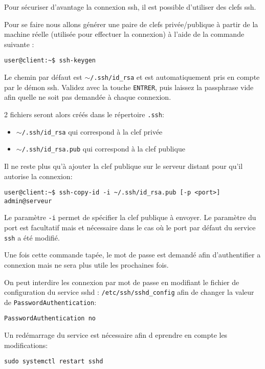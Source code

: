 Pour sécuriser d'avantage la connexion ssh, il est possible d'utiliser des clefs ssh.

Pour se faire nous allons générer une paire de clefs privée/publique à partir de la machine réelle (utilisée pour effectuer la connexion) à l'aide de la commande suivante :

    \begin{verbatim}
user@client:~$ ssh-keygen    
    \end{verbatim}

Le chemin par défaut est \texttt{$\sim$/.ssh/id\_rsa} et est automatiquement pris en compte par le démon ssh. Validez avec la touche \texttt{ENTRER}, puis laissez la passphrase vide afin quelle ne soit pas demandée à chaque connexion.

2 fichiers seront alors créés dans le répertoire \texttt{.ssh}:

    \begin{itemize}
         \item \texttt{$\sim$/.ssh/id\_rsa} qui correspond à la clef privée\\
         \item \texttt{$\sim$/.ssh/id\_rsa.pub} qui correspond à la clef publique\\
    \end{itemize}
Il ne reste plus qu'à ajouter la clef publique sur le serveur distant pour qu'il autorise la connexion:

\begin{verbatim}
user@client:~$ ssh-copy-id -i ~/.ssh/id_rsa.pub [-p <port>] admin@serveur
\end{verbatim}

Le paramètre \texttt{-i} permet de spécifier la clef publique à envoyer. Le paramètre du port est facultatif mais et nécessaire dans le cas où le port par défaut du service \texttt{ssh} a été modifié.

Une fois cette commande tapée, le mot de passe est demandé afin d'authentifier a connexion mais ne sera plus utile les prochaines fois.

On peut interdire les connexion par mot de passe en modifiant le fichier de configuration du service sshd : \texttt{/etc/ssh/sshd\_config} afin de changer la valeur de \texttt{PasswordAuthentication}:

\begin{verbatim}
PasswordAuthentication no
\end{verbatim}

Un redémarrage du service est nécessaire afin d eprendre en compte les modifications:
\begin{verbatim}
sudo systemctl restart sshd
\end{verbatim}

